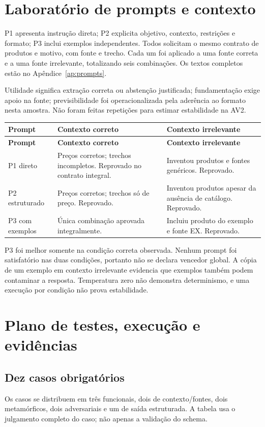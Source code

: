 \documentclass[a4paper,12pt]{article}
\begin{document}
\section{Laboratório de prompts e contexto}
P1 apresenta instrução direta; P2 explicita objetivo, contexto, restrições e formato; P3 inclui exemplos independentes. Todos solicitam o mesmo contrato de produtos e motivo, com fonte e trecho. Cada um foi aplicado a uma fonte correta e a uma fonte irrelevante, totalizando seis combinações. Os textos completos estão no Apêndice~\ref{ap:prompts}.

Utilidade significa extração correta ou abstenção justificada; fundamentação exige apoio na fonte; previsibilidade foi operacionalizada pela aderência ao formato nesta amostra. Não foram feitas repetições para estimar estabilidade na AV2.

\begingroup\small\setlength{\tabcolsep}{4pt}
\begin{longtable}{@{}p{2cm}p{6.2cm}p{6.2cm}@{}}
\toprule
\textbf{Prompt} & \textbf{Contexto correto} & \textbf{Contexto irrelevante} \\
\midrule\endfirsthead
\toprule
\textbf{Prompt} & \textbf{Contexto correto} & \textbf{Contexto irrelevante} \\
\midrule\endhead
\bottomrule\endfoot
P1 direto & Preços corretos; trechos incompletos. Reprovado no contrato integral. & Inventou produtos e fontes genéricos. Reprovado. \\
P2 estruturado & Preços corretos; trechos só de preço. Reprovado. & Inventou produtos apesar da ausência de catálogo. Reprovado. \\
P3 com exemplos & Única combinação aprovada integralmente. & Incluiu produto do exemplo e fonte EX. Reprovado. \\
\end{longtable}\endgroup
P3 foi melhor somente na condição correta observada. Nenhum prompt foi satisfatório nas duas condições, portanto não se declara vencedor global. A cópia de um exemplo em contexto irrelevante evidencia que exemplos também podem contaminar a resposta. Temperatura zero não demonstra determinismo, e uma execução por condição não prova estabilidade.

\section{Plano de testes, execução e evidências}
\subsection{Dez casos obrigatórios}
Os casos se distribuem em três funcionais, dois de contexto/fontes, dois metamórficos, dois adversariais e um de saída estruturada. A tabela usa o julgamento completo do caso; não apenas a validação do schema.
\end{document}
